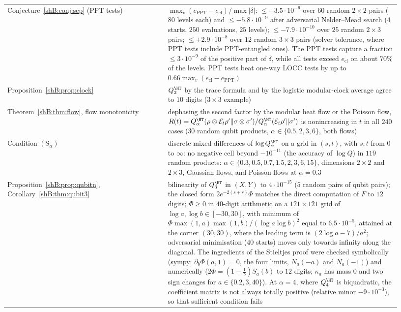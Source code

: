 {\begin{longtable}{>{\raggedright\arraybackslash}p{0.38\linewidth}>{\raggedright\arraybackslash}p{0.55\linewidth}}
Conjecture~\ref{shB:conj:sep} (PPT tests) & $\max_v(e_{\mathrm{PPT}}-e_{\mathrm{cl}})/\max|\delta|$: $\le-3.5\cdot10^{-9}$ over $60$ random $2\times2$ pairs ($80$ levels each) and $\le-5.8\cdot10^{-9}$ after adversarial Nelder--Mead search ($4$ starts, $250$ evaluations, $25$ levels); $\le-7.9\cdot10^{-10}$ over $25$ random $2\times3$ pairs; $\le+2.9\cdot10^{-8}$ over $12$ random $3\times3$ pairs (solver tolerance, where PPT tests include PPT-entangled ones). The PPT tests capture a fraction $\le3\cdot10^{-9}$ of the positive part of $\delta$, while all tests exceed $e_{\mathrm{cl}}$ on about $70\%$ of the levels. PPT tests beat one-way LOCC tests by up to $0.66\max_v(e_{\mathrm{cl}}-e_{\mathrm{PPT}})$\\
Proposition~\ref{shB:prop:clock} & $Q^\HT_2$ by the trace formula and by the logistic modular-clock average agree to $10$ digits ($3\times3$ example)\\
Theorem~\ref{shB:thm:flow}, flow monotonicity & dephasing the second factor by the modular heat flow or the Poisson flow, $R(t)=Q^\HT_\alpha(\rho\otimes\mathcal E_t\rho'\|\sigma\otimes\sigma')/Q^\HT_\alpha(\mathcal E_t\rho'\|\sigma')$ is nonincreasing in $t$ in all $240$ cases ($30$ random qubit products, $\alpha\in\{0.5,2,3,6\}$, both flows)\\
Condition $(\mathrm S_\alpha)$ & discrete mixed differences of $\log Q^\HT_\alpha$ on a grid in $(s,t)$, with $s,t$ from $0$ to $\infty$: no negative cell beyond $-10^{-11}$ (the accuracy of $\log Q$) in $119$ random products: $\alpha\in\{0.3,0.5,0.7,1.5,2,3,6,15\}$, dimensions $2\times2$ and $2\times3$, Gaussian flows, and Poisson flows at $\alpha=0.3$\\
Proposition~\ref{shB:prop:qubitn}, Corollary~\ref{shB:thm:qubit3} & bilinearity of $Q^\HT_3$ in $(X,Y)$ to $4\cdot10^{-15}$ ($5$ random pairs of qubit pairs); the closed form $2e^{-2(s+r)}\Phi$ matches the direct computation of $F$ to $12$ digits; $\Phi\ge0$ in $40$-digit arithmetic on a $121\times121$ grid of $\log a,\log b\in[-30,30]$, with minimum of $\Phi\max(1,a)\max(1,b)/(\log a\log b)^2$ equal to $6.5\cdot10^{-5}$, attained at the corner $(30,30)$, where the leading term is $(2\log a-7)/a^2$; adversarial minimisation ($40$ starts) moves only towards infinity along the diagonal. The ingredients of the Stieltjes proof were checked symbolically (sympy: $\partial_b\Phi(a,1)=0$, the four limits, $N_a(-a)$ and $N_a(-1)$) and numerically ($2\Phi=(1-\frac1b)S_a(b)$ to $12$ digits; $\kappa_a$ has mass $0$ and two sign changes for $a\in\{0.2,3,40\}$). At $\alpha=4$, where $Q^\HT_4$ is biquadratic, the coefficient matrix is not always totally positive (relative minor $-9\cdot10^{-3}$), so that sufficient condition fails\\

\end{longtable}}
